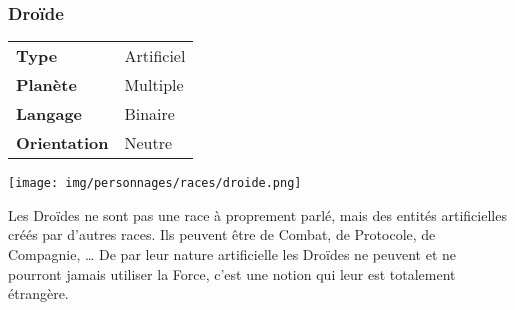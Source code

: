 \subsubsection{Droïde}
\begin{samepage}
	\vspace{4\baselineskip}
	\begin{tabular}{ l l }
		\textbf{Type} 			& Artificiel \\
	   	\textbf{Planète} 		& Multiple \\
	   	\textbf{Langage} 		& Binaire \\
	   	\textbf{Orientation} 	& Neutre \\
	\end{tabular}

	\vspace{-11\baselineskip}

	\begin{flushright}
		\texttt{[image: img/personnages/races/droide.png]}
	\end{flushright}
	\vspace{-2\baselineskip}
\end{samepage}

Les Droïdes ne sont pas une race à proprement parlé, mais des entités artificielles créés par d’autres races. Ils peuvent être de Combat, de Protocole, de Compagnie, \ldots 
De par leur nature artificielle les Droïdes ne peuvent et ne pourront jamais utiliser la Force, c’est une notion qui leur est totalement étrangère.

